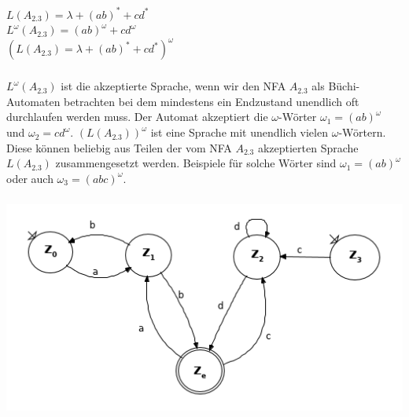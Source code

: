 \documentclass[a4paper,12pt]{scrartcl}
\title{\blatt}
\date{Gruppe 06}
\author{Sabrina Buczko 6663234, Julian Deinert 6535880, Rafael Heid 6704828}
\begin{document}
\maketitle
\newpage
\setcounter{section}{1}
\section{}
\setcounter{subsection}{2}
\subsection{}
\subsubsection{}
$L(A_{2.3})=\lambda+(ab)^*+cd^*$\\
$L^\omega(A_{2.3}) = (ab)^\omega + cd^\omega$\\
$(L(A_{2.3})=\lambda+(ab)^*+cd^*)^\omega$
\subsubsection{}
$L^\omega(A_{2.3})$ ist die akzeptierte Sprache, wenn wir den NFA $A_{2.3}$ als 
Büchi-Automaten betrachten bei dem mindestens ein Endzustand unendlich oft 
durchlaufen werden muss. Der Automat akzeptiert die $\omega$-Wörter $\omega_1 = 
(ab)^\omega$ und $\omega_2 = cd^\omega$. $(L(A_{2.3}))^\omega$ ist eine Sprache 
mit unendlich vielen $\omega$-Wörtern. Diese können beliebig aus Teilen der vom 
NFA $A_{2.3}$ akzeptierten Sprache $L(A_{2.3})$ zusammengesetzt werden. 
Beispiele für solche Wörter sind $\omega_1 = (ab)^\omega$ oder auch $\omega_3 = 
(abc)^\omega$.
\subsubsection{}
\includegraphics[scale=0.6]{G-6-A-02-Buczko_Heid_Deinert-Automat1.png}
\end{document}
